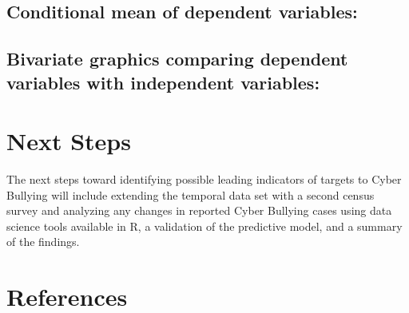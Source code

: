 \documentclass[
  man,LLO-8200, Introduction to Data Science]{apa6}
\begin{document}
\hypertarget{conditional-mean-of-dependent-variables}{%
\subsection{Conditional mean of dependent variables:}\label{conditional-mean-of-dependent-variables}}

\hypertarget{bivariate-graphics-comparing-dependent-variables-with-independent-variables}{%
\subsection{Bivariate graphics comparing dependent variables with independent variables:}\label{bivariate-graphics-comparing-dependent-variables-with-independent-variables}}

\hypertarget{next-steps}{%
\section{Next Steps}\label{next-steps}}

The next steps toward identifying possible leading indicators of targets to Cyber Bullying will include extending the temporal data set with a second census survey and analyzing any changes in reported Cyber Bullying cases using data science tools available in R, a validation of the predictive model, and a summary of the findings.

\newpage

\hypertarget{references}{%
\section*{References}\label{references}}
\end{document}

